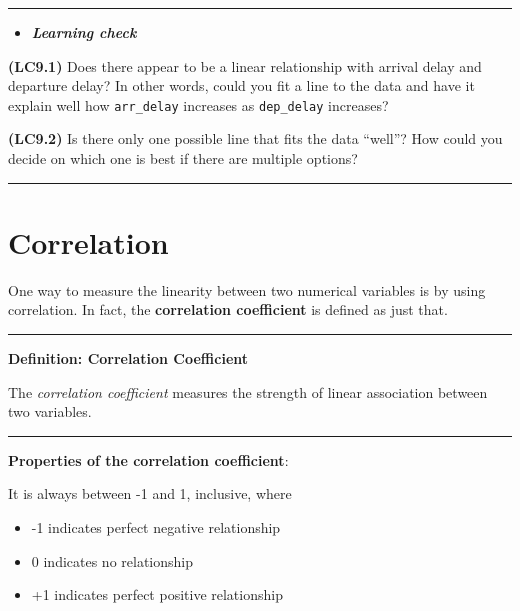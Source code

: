 \documentclass[]{tufte-book}
\let\oldrule=\rule
\renewcommand{\rule}[1]{\oldrule{\linewidth}}
\providecommand{\tightlist}{%
  \setlength{\itemsep}{0pt}\setlength{\parskip}{0pt}}
\newenvironment{rmdblock}[1]
  {\begin{shaded*}
  \begin{itemize}
  \renewcommand{\labelitemi}{
    \raisebox{-.7\height}[0pt][0pt]{
    }
  }
  \item
  }
  {
  \end{itemize}
  \end{shaded*}
  }
\newenvironment{learncheck}
  {\begin{rmdblock}{warning}}
  {\end{rmdblock}}
\theoremstyle{definition}
\theoremstyle{definition}
\theoremstyle{remark}
\begin{document}
\begin{center}\rule{0.5\linewidth}{\linethickness}\end{center}

\begin{learncheck}
\textbf{\emph{Learning check}}
\end{learncheck}

\textbf{(LC9.1)} Does there appear to be a linear relationship with
arrival delay and departure delay? In other words, could you fit a line
to the data and have it explain well how \texttt{arr\_delay} increases
as \texttt{dep\_delay} increases?

\textbf{(LC9.2)} Is there only one possible line that fits the data
``well''? How could you decide on which one is best if there are
multiple options?

\begin{center}\rule{0.5\linewidth}{\linethickness}\end{center}

\section{Correlation}\label{correlation}

One way to measure the linearity between two numerical variables is by
using correlation. In fact, the \textbf{correlation coefficient} is
defined as just that.

\begin{center}\rule{0.5\linewidth}{\linethickness}\end{center}

\textbf{Definition: Correlation Coefficient}

The \emph{correlation coefficient} measures the strength of linear
association between two variables.

\begin{center}\rule{0.5\linewidth}{\linethickness}\end{center}

\textbf{Properties of the correlation coefficient}:

It is always between -1 and 1, inclusive, where

\begin{itemize}
\tightlist
\item
  -1 indicates perfect negative relationship
\item
  0 indicates no relationship
\item
  +1 indicates perfect positive relationship
\end{itemize}
\end{document}
